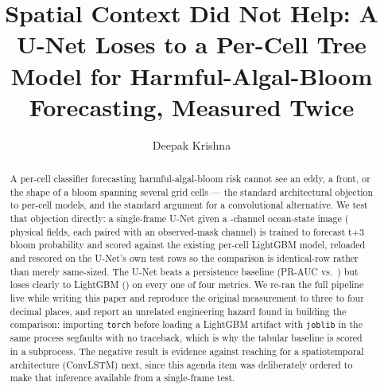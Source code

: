 \documentclass[runningheads]{llncs}
\begin{document}
\title{Spatial Context Did Not Help: A U-Net Loses to a Per-Cell Tree Model
for Harmful-Algal-Bloom Forecasting, Measured Twice}


\author{Deepak Krishna}

\maketitle

\begin{abstract}
A per-cell classifier forecasting harmful-algal-bloom risk cannot see an
eddy, a front, or the shape of a bloom spanning several grid cells --- the
standard architectural objection to per-cell models, and the standard
argument for a convolutional alternative. We test that objection directly:
a single-frame U-Net given a \NInputChannels{}-channel ocean-state image
(\NChannels{} physical fields, each paired with an observed-mask channel)
is trained to forecast t+3 bloom probability and scored against the
existing per-cell LightGBM model, reloaded and rescored on the U-Net's own
\NTestRows{} test rows so the comparison is identical-row rather than
merely same-sized. The U-Net beats a persistence baseline (PR-AUC
\UnetPRAUC{} vs.\ \PersistPRAUC{}) but loses clearly to LightGBM
(\LgbmPRAUC{}) on every one of four metrics. We re-ran the full pipeline
live while writing this paper and reproduce the original measurement to
three to four decimal places, and report an unrelated engineering hazard
found in building the comparison: importing \texttt{torch} before loading a
LightGBM artifact with \texttt{joblib} in the same process segfaults with
no traceback, which is why the tabular baseline is scored in a subprocess.
The negative result is evidence against reaching for a spatiotemporal
architecture (ConvLSTM) next, since this agenda item was deliberately
ordered to make that inference available from a single-frame test.
\end{abstract}


\end{document}
